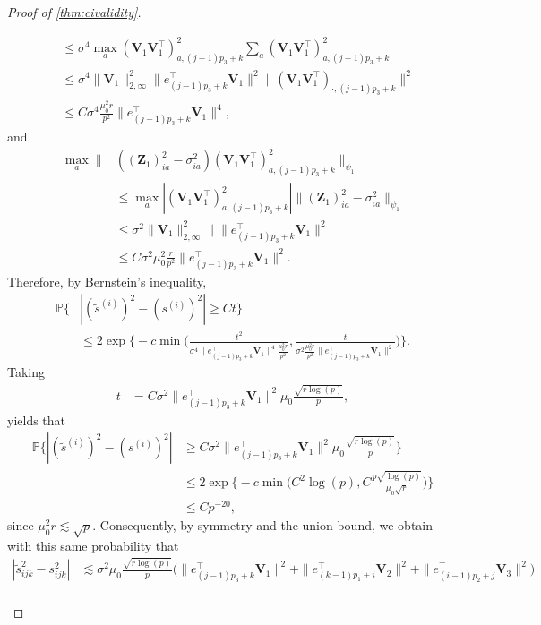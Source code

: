 \documentclass[10pt]{article}
\newcommand{\0}{{\mathbf{0}}}
\newcommand{\1}{{\mathbf{1}}}
\renewcommand{\t}{^{\top}}
\newcommand{\p}{\mathbb{P}}
\renewcommand{\tilde}{\widetilde}
\begin{document}
\begin{proof}[Proof of \cref{thm:civalidity}]
\begin{itemize}
\begin{align*}
    &\leq \sigma^4 \max_{a}  (\mathbf{V}_1 \mathbf{V}_1\t)_{a,(j-1)p_3 + k}^2 \sum_{a} (\mathbf{V}_1 \mathbf{V}_1\t)_{a,(j-1)p_3 + k}^2 \\
    &\leq \sigma^4 \| \mathbf{V}_1 \|_{2,\infty}^2 \| e_{(j-1)p_3 + k}\t \mathbf{V}_1 \|^2 \| (\mathbf{V}_1 \mathbf{V}_1\t)_{\cdot,(j-1)p_3 + k } \|^2 \\
    &\leq C \sigma^4 \frac{ \mu_0^2 r}{p^2} \| e_{(j-1)p_3 + k}\t \mathbf{V}_1 \|^4,
    \end{align*}
and
\begin{align*}
    \max_{a}\|& (( \mathbf{Z}_1)_{ia}^2 - \sigma^2_{ia} ) (\mathbf{V}_1 \mathbf{V}_1\t)_{a,(j-1)p_3 + k}^2 \|_{\psi_1}   \\
     &\leq \max_{a} | (\mathbf{V}_1 \mathbf{V}_1\t)_{a,(j-1)p_3 + k}^2 | \|(\mathbf{Z}_1)_{ia}^2 - \sigma^2_{ia} \|_{\psi_1} \\
    &\leq \sigma^2 \| \mathbf{V}_1 \|_{2,\infty}^2 \| \| e_{(j-1)p_3 + k}\t \mathbf{V}_1 \|^2  \\
    &\leq C\sigma^2 \mu_0^2 \frac{r}{p^2} \|  e_{(j-1)p_3 + k}\t \mathbf{V}_1 \|^2.
\end{align*}
Therefore, by Bernstein's inequality, 
\begin{align*}
    \p\bigg\{ &| (\tilde s^{(i)})^2 - (s^{(i)})^2 | \geq C t \bigg\} \\
    &\leq 2 \exp \bigg\{ -c \min\bigg( \frac{t^2}{\sigma^4 \| e_{(j-1)p_3 + k}\t \mathbf{V}_1 \|^4 \frac{\mu_0^2  r}{p^2} }, \frac{t }{ \sigma^2 \frac{\mu_0^2 r}{p^2} \|  e_{(j-1)p_3 + k}\t \mathbf{V}_1 \|^2   } \bigg) \bigg\}.
\end{align*}
Taking
\begin{align*}
    t &= C\sigma^2 \| e_{(j-1)p_3 + k}\t \mathbf{V}_1 \|^2 \mu_0 \frac{\sqrt{r\log(p)}}{p},
\end{align*}
yields that
\begin{align*}
     \p\bigg\{ | (\tilde s^{(i)})^2 - (s^{(i)})^2 | &\geq C\sigma^2 \| e_{(j-1)p_3 + k}\t \mathbf{V}_1 \|^2 \mu_0 \frac{\sqrt{r\log(p)}}{p} \bigg\} \\
     &\leq 2 \exp \bigg\{ -c \min\bigg( C^2\log(p) , C\frac{p\sqrt{\log(p)}}{\mu_0 \sqrt{r}} \bigg) \bigg\} \\
     &\leq Cp^{-20},
\end{align*}
since $\mu_0^2 r \lesssim \sqrt{p}$.  Consequently, by symmetry and the union bound, we obtain with this same probability that
\begin{align*}
    | \tilde s_{ijk}^2 - s_{ijk}^2 | &\lesssim \sigma^2 \mu_0 \frac{\sqrt{r\log(p)}}{p} \bigg(  \| e_{(j-1)p_3 + k}\t \mathbf{V}_1 \|^2 + \| e_{(k-1)p_1 + i}\t \mathbf{V}_2 \|^2 + \| e_{(i-1)p_2 + j}\t \mathbf{V}_3 \|^2 \bigg) \\

\end{align*}
\end{itemize}
\end{proof}
\end{document}
